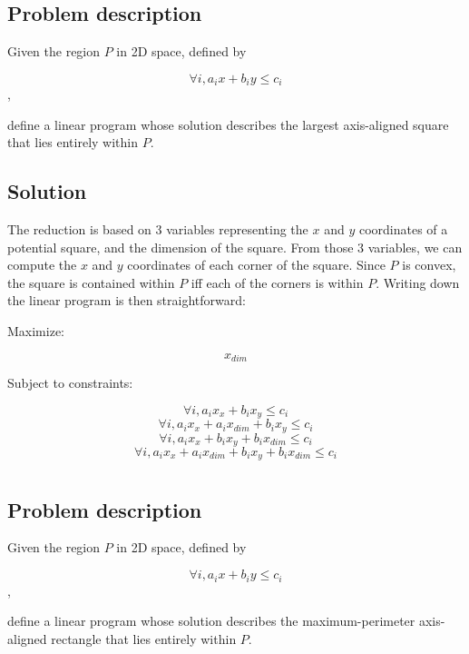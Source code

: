 \documentclass{article}
\begin{document}
\section{}

\subsection{Problem description}

Given the region $P$ in 2D space, defined by 

$$\forall i, a_i x + b_i y \leq c_i $$,

define a linear program whose solution describes the largest axis-aligned
square that lies entirely within $P$.

\subsection{Solution}

The reduction is based on 3 variables representing the $x$ and $y$ coordinates
of a potential square, and the dimension of the square. From those 3
variables, we can compute the $x$ and $y$ coordinates of each corner of the
square. Since $P$ is convex, the square is contained within $P$ iff each of
the corners is within $P$. Writing down the linear program is then
straightforward:

Maximize: 

$$x_{dim}$$

Subject to constraints:

$$\forall i, a_i x_x + b_i x_y \leq c_i$$
$$\forall i, a_i x_x + a_i x_{dim} + b_i x_y \leq c_i$$
$$\forall i, a_i x_x + b_i x_y + b_i x_{dim} \leq c_i$$
$$\forall i, a_i x_x + a_i x_{dim} + b_i x_y + b_i x_{dim} \leq c_i$$

\section{}

\subsection{Problem description}

Given the region $P$ in 2D space, defined by 

$$\forall i, a_i x + b_i y \leq c_i $$,

define a linear program whose solution describes the maximum-perimeter axis-aligned
rectangle that lies entirely within $P$.
\end{document}
